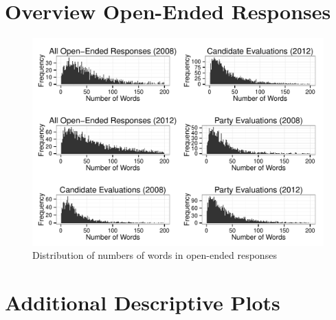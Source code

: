\documentclass[12pt]{article}
\begin{document}


\clearpage
\section{Overview Open-Ended Responses}\label{app:oview}
\renewcommand\thefigure{\thesection.\arabic{figure}}
\renewcommand\thetable{\thesection.\arabic{table}}
\setcounter{figure}{0}
\setcounter{table}{0}



\begin{figure}[h]\centering
\includegraphics[scale=.8]{../calc/fig/appB2num.pdf}
\caption{Distribution of numbers of words in open-ended responses}\label{fig:appB2num}
\end{figure}

\clearpage
\section{Additional Descriptive Plots}\label{app:desc}
\renewcommand\thefigure{\thesection.\arabic{figure}}
\renewcommand\thetable{\thesection.\arabic{table}}
\setcounter{figure}{0}
\setcounter{table}{0}
\end{document}
